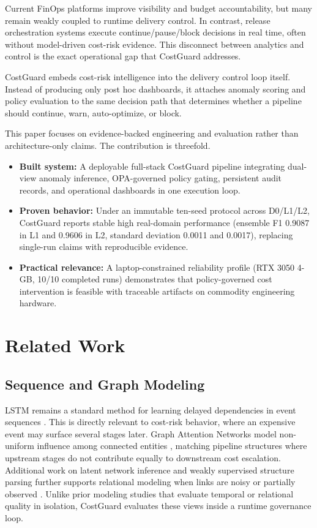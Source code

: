 \documentclass[journal]{IEEEtran}
\begin{document}
Current FinOps platforms improve visibility and budget accountability, but many remain weakly coupled to runtime delivery control. In contrast, release orchestration systems execute continue/pause/block decisions in real time, often without model-driven cost-risk evidence. This disconnect between analytics and control is the exact operational gap that CostGuard addresses.

CostGuard embeds cost-risk intelligence into the delivery control loop itself. Instead of producing only post hoc dashboards, it attaches anomaly scoring and policy evaluation to the same decision path that determines whether a pipeline should continue, warn, auto-optimize, or block.

This paper focuses on evidence-backed engineering and evaluation rather than architecture-only claims. The contribution is threefold.
\begin{itemize}
\item \textbf{Built system:} A deployable full-stack CostGuard pipeline integrating dual-view anomaly inference, OPA-governed policy gating, persistent audit records, and operational dashboards in one execution loop.
\item \textbf{Proven behavior:} Under an immutable ten-seed protocol across D0/L1/L2, CostGuard reports stable high real-domain performance (ensemble F1 0.9087 in L1 and 0.9606 in L2, standard deviation 0.0011 and 0.0017), replacing single-run claims with reproducible evidence.
\item \textbf{Practical relevance:} A laptop-constrained reliability profile (RTX 3050 4-GB, 10/10 completed runs) demonstrates that policy-governed cost intervention is feasible with traceable artifacts on commodity engineering hardware.
\end{itemize}

\FloatBarrier
\section{Related Work}
\subsection{Sequence and Graph Modeling}
LSTM remains a standard method for learning delayed dependencies in event sequences \cite{ref_lstm}. This is directly relevant to cost-risk behavior, where an expensive event may surface several stages later. Graph Attention Networks model non-uniform influence among connected entities \cite{ref_gat}, matching pipeline structures where upstream stages do not contribute equally to downstream cost escalation. Additional work on latent network inference and weakly supervised structure parsing further supports relational modeling when links are noisy or partially observed \cite{ref_ghostlink,ref_wsvsp}. Unlike prior modeling studies that evaluate temporal or relational quality in isolation, CostGuard evaluates these views inside a runtime governance loop.
\end{document}
